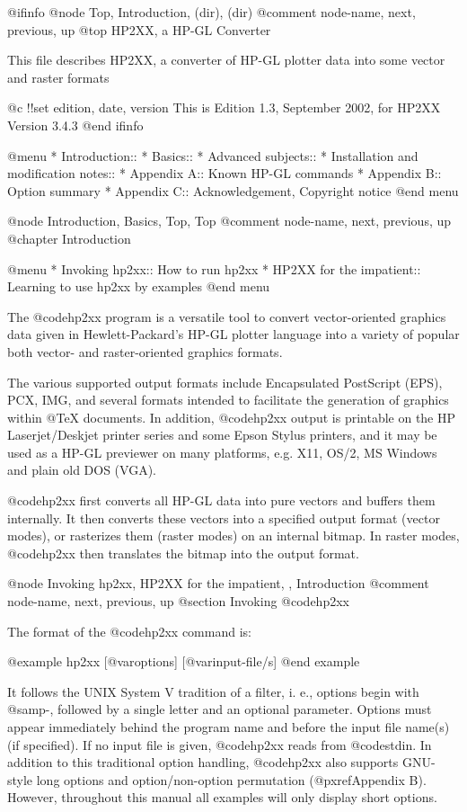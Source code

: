 @ifinfo
@node Top, Introduction, (dir), (dir)
@comment  node-name,  next,  previous,  up
@top HP2XX, a HP-GL Converter

This file describes HP2XX, a converter of HP-GL plotter data into
some vector and raster formats

@c !!set edition, date, version
This is Edition 1.3, September 2002, for HP2XX Version 3.4.3
@end ifinfo


@menu
* Introduction::
* Basics::
* Advanced subjects::
* Installation and modification notes::
* Appendix A::                          Known HP-GL commands
* Appendix B::                          Option summary
* Appendix C::                          Acknowledgement, Copyright notice
@end menu

@node Introduction, Basics, Top, Top
@comment  node-name,  next,  previous,  up
@chapter Introduction

@menu
* Invoking hp2xx::          How to run hp2xx
* HP2XX for the impatient:: Learning to use hp2xx by examples
@end menu

The @code{hp2xx} program is a versatile tool to convert vector-oriented
graphics data given in Hewlett-Packard's HP-GL plotter language
into a variety of popular both vector- and raster-oriented graphics formats.

The various supported output formats include Encapsulated PostScript (EPS),
PCX, IMG, and several formats intended to facilitate the generation of
graphics within @TeX{} documents.
In addition, @code{hp2xx} output is printable on the HP Laserjet/Deskjet
printer series and some Epson Stylus printers, and it may be used as a HP-GL 
previewer on many platforms, e.g. X11, OS/2, MS Windows and plain old DOS (VGA).

@code{hp2xx} first converts all HP-GL data into pure vectors and buffers
them internally. It then converts these vectors into a specified output
format (vector modes), or rasterizes them (raster modes) on an internal
bitmap. In raster modes, @code{hp2xx} then translates the bitmap into the
output format.



@node Invoking hp2xx, HP2XX for the impatient, , Introduction
@comment  node-name,  next,  previous,  up
@section Invoking @code{hp2xx}

The format of the @code{hp2xx} command is:

@example
hp2xx [@var{options}] [@var{input-file/s}]
@end example

It follows the UNIX System V tradition of a filter, i. e., options begin
with @samp{-}, followed by a single letter and an optional parameter.
Options must appear immediately behind the program name and before the input
file name(s) (if specified). If no input file is given, @code{hp2xx} reads
from @code{stdin}. In addition to this traditional option handling,
@code{hp2xx} also supports GNU-style long options and option/non-option
permutation (@pxref{Appendix B}). However, throughout this manual
all examples will only display short options.

